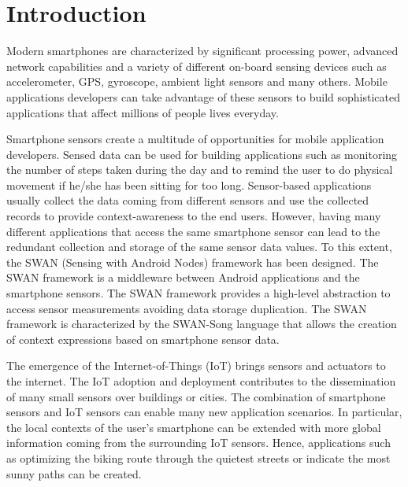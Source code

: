 \chapter{Introduction}
Modern smartphones are characterized by significant processing power, advanced network capabilities and a variety of different on-board sensing devices such as accelerometer, GPS, gyroscope, ambient light sensors and many others. Mobile applications developers can take advantage of these sensors to build sophisticated applications that affect millions of people lives everyday.

Smartphone sensors create a multitude of opportunities for mobile application developers. Sensed data can be used for building applications such as monitoring the number of steps taken during the day and to remind the user to do physical movement if he/she has been sitting for too long. Sensor-based applications usually collect the data coming from different sensors and use the collected records to provide context-awareness to the end users. However, having many different applications that access the same smartphone sensor can lead to the redundant collection and storage of the same sensor data values. To this extent, the SWAN (Sensing with Android Nodes) framework \cite{swanphd} has been designed. The SWAN framework is a middleware between Android applications and the smartphone sensors. The SWAN framework provides a high-level abstraction to access sensor measurements avoiding data storage duplication. The SWAN framework is characterized by the SWAN-Song language that allows the creation of context expressions based on smartphone sensor data.

The emergence of the Internet-of-Things (IoT) brings sensors and actuators to the internet. The IoT adoption and deployment contributes to the dissemination of many small sensors over buildings or cities. The combination of smartphone sensors and IoT sensors can enable many new application scenarios. In particular, the local contexts of the user's smartphone can be extended with more global information coming from the surrounding IoT sensors. Hence, applications such as optimizing the biking route through the quietest streets or indicate the most sunny paths can be created. 


